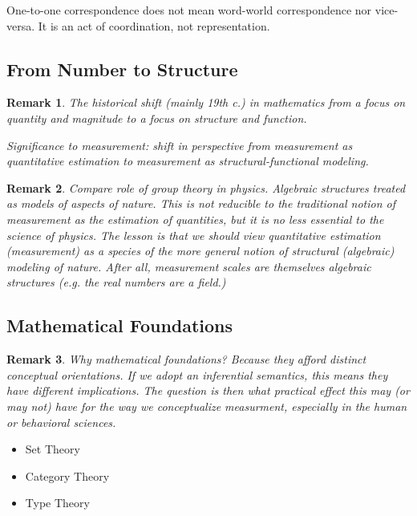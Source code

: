 \documentclass[11pt,twoside]{article}
\newtheorem{remark}{Remark}
\begin{document}
One-to-one correspondence does not mean word-world correspondence nor
vice-versa.  It is an act of coordination, not representation.

\subsection{From Number to Structure}

\begin{remark}
The historical shift (mainly 19th c.) in mathematics from a focus on
quantity and magnitude to a focus on structure and function.

Significance to measurement: shift in perspective from measurement as
quantitative estimation to measurement as structural-functional modeling.
\end{remark}

\begin{remark}
  Compare role of group theory in physics.  Algebraic structures
  treated as models of aspects of nature.  This is not reducible to
  the traditional notion of measurement as the estimation of
  quantities, but it is no less essential to the science of physics.
  The lesson is that we should view quantitative estimation
  (measurement) as a species of the more general notion of structural
  (algebraic) modeling of nature.  After all, measurement scales are
  themselves algebraic structures (e.g. the real numbers are a field.)
\end{remark}

\subsection{Mathematical Foundations}

\begin{remark}
  Why mathematical foundations?  Because they afford distinct
  \textit{conceptual} orientations.  If we adopt an inferential
  semantics, this means they have different implications.  The
  question is then what practical effect this may (or may not) have
  for the way we conceptualize measurment, especially in the human or
  behavioral sciences.
\end{remark}

\begin{itemize}
\item Set Theory
\item Category Theory
\item Type Theory
\end{itemize}
\end{document}
